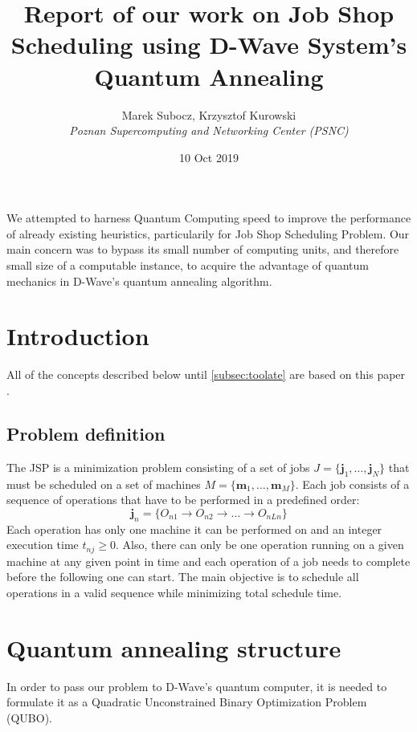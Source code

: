 \documentclass[letterpaper, 11pt]{article}
\title{Report of our work on Job Shop Scheduling using D-Wave System's Quantum Annealing}
\author{
Marek Subocz, Krzysztof Kurowski \\
\textit{Poznan Supercomputing and Networking Center (PSNC)}
}
\date{10 Oct 2019}
\begin{document}
\maketitle
We attempted to harness Quantum Computing speed to improve the 
performance of already existing heuristics, particularily 
for Job Shop Scheduling Problem. Our main concern was to bypass
its small number of computing units, and therefore small size
of a computable instance, to acquire the advantage of quantum
mechanics in D-Wave's quantum annealing algorithm. 
\vspace{10pt}
\begin{multicols}{2}


\section{Introduction}
All of the concepts described below until \ref{subsec:toolate} are based on this paper \cite{main_paper}.
\label{sec:intro}

\subsection{Problem definition}
The JSP is a minimization problem consisting of  a set of jobs 
$J = \{\textbf{j}_1,\dots,\textbf{j}_N\}$
that must be scheduled on a set of machines
$M = \{\textbf{m}_1, \dots, \textbf{m}_M\}$. 
Each job consists of a sequence of operations that have to be performed
in a predefined order:
\begin{equation}
\textbf{j}_n = \{O_{n1} \rightarrow O_{n2} \rightarrow \dots \rightarrow O_{nLn}\}
\end{equation}
Each operation has only one machine it can be performed on and an
integer execution time $t_{nj} \geq 0$.
Also, there can only be one operation running on a given machine at 
any given point in time and each operation of a job needs to complete 
before the following one can start. The main objective is to schedule
all operations in a valid sequence while minimizing total schedule time.


\section{Quantum annealing structure}
\label{sec:QAS}
In order to pass our problem to D-Wave's quantum computer,
it is needed to formulate it as a Quadratic Unconstrained Binary
Optimization Problem (QUBO).


\end{multicols}
\end{document}
